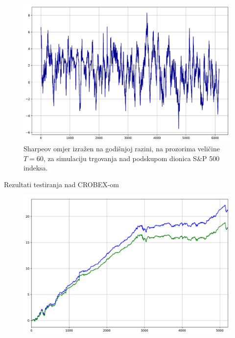 \documentclass[lmodern, utf8, diplomski, numeric]{fer}
\begin{document}
  \begin{figure}[p]
    \centering
    \includegraphics[width=\linewidth]{graphics/sharpe1.pdf}
    \caption{Sharpeov omjer izražen na godišnjoj razini, na prozorima veličine $T = 60$, za simulaciju trgovanja nad podskupom dionica S\&P 500 indeksa.}
    \label{fig:sharpe2}
  \end{figure}

  
  \pagebreak

  Rezultati testiranja nad CROBEX-om
    \begin{figure}[p]
    \centering
    \includegraphics[width=\linewidth]{graphics/results2.pdf}
    \caption{}
    \label{fig:results3}
  \end{figure}
  
\end{document}
